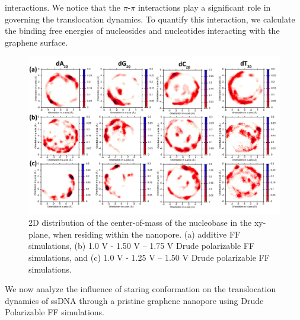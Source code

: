 interactions. We notice that the $\pi$-$\pi$ interactions play a significant role in governing the translocation dynamics. To quantify this interaction, we calculate the binding free energies of nucleosides and nucleotides interacting with the graphene surface. 
\begin{figure}
    \centering
    \includegraphics[width=\textwidth]{Chapter4/Figures/Figure8.png}
    \caption[2D distribution of the center-of-mass of the nucleobase in the xy-plane, when residing within the nanopore from additive, Drude and Drude' simulations]{2D distribution of the center-of-mass of the nucleobase in the xy-plane, when residing within the nanopore. (a) additive FF simulations, (b) 1.0 V - 1.50 V – 1.75 V Drude polarizable FF simulations, and (c) 1.0 V - 1.25 V – 1.50 V Drude polarizable FF simulations.}
\end{figure}

We now analyze the influence of staring conformation on the translocation dynamics of ssDNA through a pristine graphene nanopore using Drude Polarizable FF simulations.

